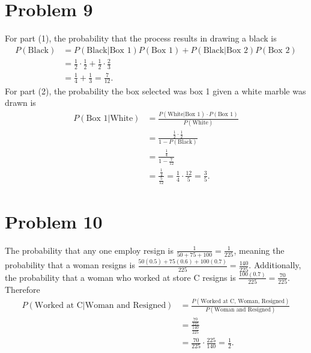 \documentclass[12pt]{extarticle}
\begin{document}
\section*{Problem 9}
% 
% 
% 
% 
For part (1), the probability that the process results in drawing a black is
\begin{align*}
	P(\text{Black}) &= P(\text{Black} | \text{Box $1$})P(\text{Box $1$}) + P(\text{Black} | \text{Box $2$})P(\text{Box $2$}) \\
									&= \frac{1}{2}\cdot\frac{1}{2} + \frac{1}{2}\cdot\frac{2}{3} \\
									&= \frac{1}{4} + \frac{1}{3}
									= \frac{7}{12}
.\end{align*}
For part (2), the probability the box selected was box 1 given a white marble was drawn is
\begin{align*}
	P(\text{Box }1 | \text{White}) &= \frac{P(\text{White}|\text{Box }1) \cdot P(\text{Box }1)}{P(\text{White})} \\
																 &= \frac{\frac{1}{2} \cdot \frac{1}{2}}{1 - P(\text{Black})} \\
																 &= \frac{\frac{1}{4}}{1 - \frac{7}{12}} \\
																 &= \frac{\frac{1}{4}}{\frac{5}{12}}
																 = \frac{1}{4}\cdot\frac{12}{5}
																 = \frac{3}{5}
.\end{align*}

\section*{Problem 10}
% 
% 
% 

The probability that any one employ resign is $\frac{1}{50 + 75 + 100} = \frac{1}{225}$, meaning the probability that a woman resigns is $\frac{50(0.5) + 75(0.6) + 100(0.7)}{225} = \frac{140}{225}$. Additionally, the probability that a woman who worked at store C resigns is $\frac{100(0.7)}{225} = \frac{70}{225}$. Therefore
\begin{align*}
	P(\text{Worked at C}| \text{Woman and Resigned}) &= \frac{P(\text{Worked at C, Woman, Resigned})}{P(\text{Woman and Resigned})} \\
																									 &= \frac{\frac{70}{225}}{\frac{140}{225}} \\
																									 &= \frac{70}{225}\cdot\frac{225}{140}
																									 = \frac{1}{2}
.\end{align*}
\end{document}
